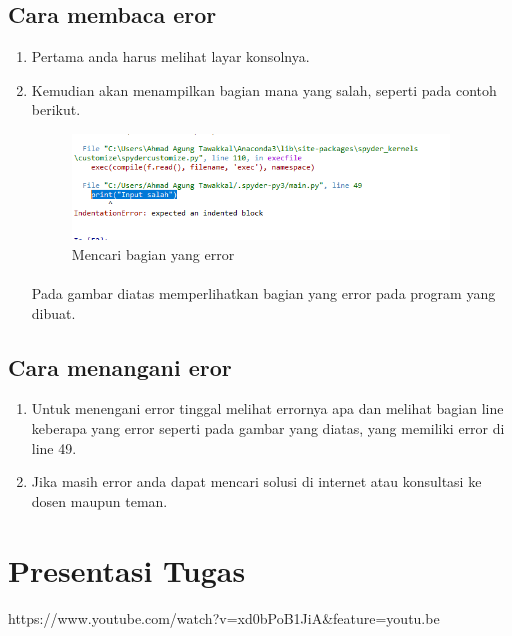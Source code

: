 \documentclass{article}
\begin{document}
\subsection {Cara membaca eror}
    \begin{enumerate}
        \item Pertama anda harus melihat layar konsolnya.
        \item Kemudian akan menampilkan bagian mana yang salah, seperti pada contoh berikut.
            \begin{figure}[ht]
                \centerline{\includegraphics[width=10cm]{gambar5.PNG}}
                \caption{Mencari bagian yang error}
            \end{figure}
                \paragraph{}Pada gambar diatas memperlihatkan bagian yang error pada program yang dibuat.
    \end{enumerate}
    
\subsection {Cara menangani eror}
    \begin{enumerate}
        \item Untuk menengani error tinggal melihat errornya apa dan melihat bagian line keberapa yang error seperti pada gambar yang diatas, yang memiliki error di line 49.
        \item Jika masih error anda dapat mencari solusi di internet atau konsultasi ke dosen maupun teman.
    \end{enumerate}

\section{Presentasi Tugas}
\paragraph{}https://www.youtube.com/watch?v=xd0bPoB1JiA&feature=youtu.be
\end{document}

